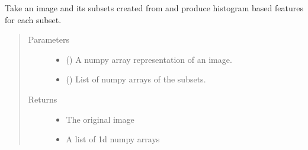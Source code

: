 \documentclass[letterpaper,10pt,english]{sphinxmanual}
\begin{document}
\begin{fulllineitems}
\label{\detokenize{api:readpyne.core.features}}
Take an image and its subsets created from  and
produce histogram based features for each subset.
\begin{quote}\begin{description}
\item[{Parameters}] \leavevmode\begin{itemize}
\item {} 
 () \textendash{} A numpy array representation of an image.

\item {} 
 () \textendash{} List of numpy arrays of the subsets.

\end{itemize}

\item[{Returns}] \leavevmode
\begin{itemize}
\item {} 
 \textendash{} The original image

\item {} 
 \textendash{} A list of 1d numpy arrays

\end{itemize}


\end{description}\end{quote}

\end{fulllineitems}

\end{document}
